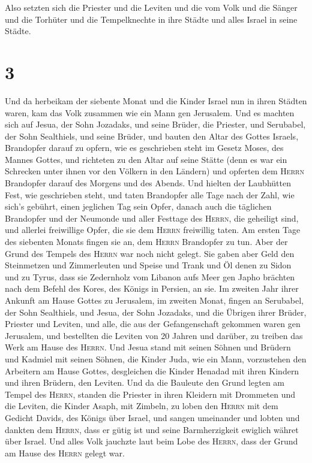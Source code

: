  Also setzten sich die Priester und die Leviten und die
vom Volk und die Sänger und die Torhüter und die Tempelknechte in ihre
Städte und alles Israel in seine Städte.

\hypertarget{section-2}{%
\section{3}\label{section-2}}

 Und da herbeikam der siebente Monat und die Kinder Israel
nun in ihren Städten waren, kam das Volk zusammen wie ein Mann gen
Jerusalem.  Und es machten sich auf Jesua, der Sohn
Jozadaks, und seine Brüder, die Priester, und Serubabel, der Sohn
Sealthiels, und seine Brüder, und bauten den Altar des Gottes Israels,
Brandopfer darauf zu opfern, wie es geschrieben steht im Gesetz Moses,
des Mannes Gottes,  und richteten zu den Altar auf seine
Stätte (denn es war ein Schrecken unter ihnen vor den Völkern in den
Ländern) und opferten dem \textsc{Herrn} Brandopfer darauf des Morgens
und des Abends.  Und hielten der Laubhütten Fest, wie
geschrieben steht, und taten Brandopfer alle Tage nach der Zahl, wie
sich's gebührt, einen jeglichen Tag sein Opfer,  danach
auch die täglichen Brandopfer und der Neumonde und aller Festtage des
\textsc{Herrn}, die geheiligt sind, und allerlei freiwillige Opfer, die
sie dem \textsc{Herrn} freiwillig taten.  Am ersten Tage
des siebenten Monats fingen sie an, dem \textsc{Herrn} Brandopfer zu
tun. Aber der Grund des Tempels des \textsc{Herrn} war noch nicht
gelegt.  Sie gaben aber Geld den Steinmetzen und
Zimmerleuten und Speise und Trank und Öl denen zu Sidon und zu Tyrus,
dass sie Zedernholz vom Libanon aufs Meer gen Japho brächten nach dem
Befehl des Kores, des Königs in Persien, an sie.  Im
zweiten Jahr ihrer Ankunft am Hause Gottes zu Jerusalem, im zweiten
Monat, fingen an Serubabel, der Sohn Sealthiels, und Jesua, der Sohn
Jozadaks, und die Übrigen ihrer Brüder, Priester und Leviten, und alle,
die aus der Gefangenschaft gekommen waren gen Jerusalem, und bestellten
die Leviten von 20 Jahren und darüber, zu treiben das Werk am Hause des
\textsc{Herrn}.  Und Jesua stand mit seinen Söhnen und
Brüdern und Kadmiel mit seinen Söhnen, die Kinder Juda, wie ein Mann,
vorzustehen den Arbeitern am Hause Gottes, desgleichen die Kinder
Henadad mit ihren Kindern und ihren Brüdern, den Leviten.
 Und da die Bauleute den Grund legten am Tempel des
\textsc{Herrn}, standen die Priester in ihren Kleidern mit Drommeten und
die Leviten, die Kinder Asaph, mit Zimbeln, zu loben den \textsc{Herrn}
mit dem Gedicht Davids, des Königs über Israel,  und
sangen umeinander und lobten und dankten dem \textsc{Herrn}, dass er
gütig ist und seine Barmherzigkeit ewiglich währet über Israel. Und
alles Volk jauchzte laut beim Lobe des \textsc{Herrn}, dass der Grund am
Hause des \textsc{Herrn} gelegt war.

